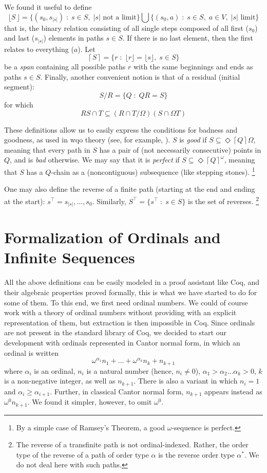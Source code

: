 \documentclass{llncs}
\newcommand{\Span}[1]{\left\lceil#1\right\rceil}
\newcommand{\ABC}{V}
\newcommand{\Bang}[1]{\mathop!#1}
\begin{document}
We found it useful to define
\[
\lfloor S\,\rfloor =\big\{(s_0, s_{|s|}) \;\colon\; s\in S,\;|s| \mbox{ not a limit}\big\} \bigcup \big\{(s_0, a) \;\colon\; s\in S,\; a\in\ABC,\;|s|\mbox{ limit}\big\} 
\]
that is, the binary relation
consisting of all single steps composed of all first ($s_0$) and last ($s_{|s|}$) elements 
in paths $s\in S$.
If there is no last element, then the first relates to everything ($a$).
Let
\[
\Span S = \{r \;\colon\; \lfloor r\rfloor=\lfloor s\rfloor,\; s\in S\}
\]
be a \emph{span}
containing all possible paths $r$ with the same beginnings and ends
as paths $s\in S$.
Finally, another convenient notion is that of a residual (initial segment):
\[
S/R = \{Q \;\colon\; QR=S\} 
\]
for which
\[
R S  \cap T \subseteq (R\cap T /\Omega)(S\cap\Omega T)
\]

These definitions allow us to easily express the conditions for badness and goodness, as used in wqo  theory (see, for example, \cite[Chap.\ 12]{Graph}).
$S$ is \emph{good} if $S \subseteq \Diamond \Span Q \Omega$, 
meaning that every path in $S$ has a pair of (not necessarily consecutive) points in $Q$,
and is \emph{bad} otherwise.
We may say that it is 
\emph{perfect} if $S \subseteq \Diamond {\Span Q}^\omega$,
meaning that $S$ has a $Q$-chain as a (noncontiguous) subsequence (like stepping stones).%
\footnote{By a simple case of Ramsey's Theorem, a good $\omega$-sequence is perfect.}

One may also define
the reverse of a finite path (starting at the end and ending at the start):
$s^\intercal = s_{|s|},\dots,s_0$.
Similarly,
$S^\intercal =\{s^\intercal \;\colon\; s\in S\}$ is the set of reverses.%
\footnote{The reverse of a transfinite path is not ordinal-indexed.
Rather, the order type of the reverse of a path of order type $\alpha$ is the
reverse order type $\alpha^\ast$.
We do not deal here with such paths.}
 
\section{Formalization of Ordinals and Infinite Sequences}
 
All the above definitions can be easily modeled in a proof assistant
like Coq, and their algebraic properties proved formally, this is what
we have started to do for some of them. To this end, we first need
ordinal numbers. We could of course work with a theory of ordinal
numbers without providing with an explicit representation of them, but
extraction is then impossible in Coq. Since ordinals are not present
in the standard library of Coq, we decided to start our development
with ordinals represented in Cantor normal form, in which an ordinal
is written
\[\omega^{\alpha_1}n_1 + \ldots + \omega^{\alpha_k}n_k + n_{k+1}\]
where $\alpha_i$ is an ordinal, $n_i$ is a natural number (hence,
$n_i\neq 0$), $\alpha_1 > \alpha_2\ldots \alpha_k > 0$, $k$ is a
non-negative integer, as well as $n_{k+1}$. There is also a variant in
which $n_i=1$ and $\alpha_i\geq\alpha_{i+1}$. Further, in classical
Cantor normal form, $n_{k+1}$ appears instead as
$\omega^{0}n_{k+1}$. We found it simpler, however, to omit $\omega^0$.
\end{document}
